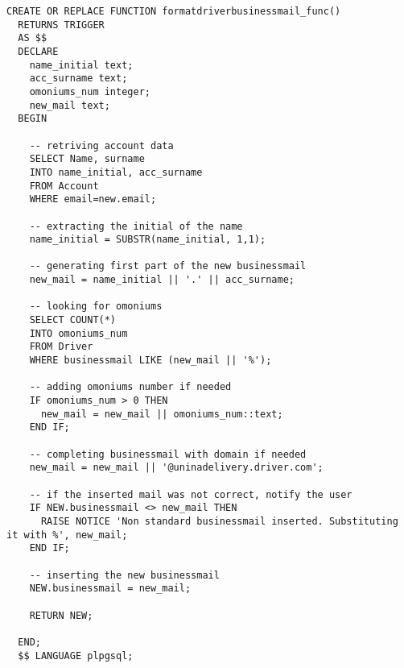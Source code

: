 \begin{lstlisting}[caption={Funzione per il vincolo \textbf{formatDriverBusinessmail}}]
  CREATE OR REPLACE FUNCTION formatdriverbusinessmail_func()
  RETURNS TRIGGER
  AS $$
  DECLARE
    name_initial text;
    acc_surname text;
    omoniums_num integer;
    new_mail text;
  BEGIN

    -- retriving account data
    SELECT Name, surname
    INTO name_initial, acc_surname
    FROM Account
    WHERE email=new.email;

    -- extracting the initial of the name
    name_initial = SUBSTR(name_initial, 1,1);

    -- generating first part of the new businessmail
    new_mail = name_initial || '.' || acc_surname;

    -- looking for omoniums
    SELECT COUNT(*)
    INTO omoniums_num
    FROM Driver
    WHERE businessmail LIKE (new_mail || '%');

    -- adding omoniums number if needed
    IF omoniums_num > 0 THEN
      new_mail = new_mail || omoniums_num::text;
    END IF;

    -- completing businessmail with domain if needed
    new_mail = new_mail || '@uninadelivery.driver.com';

    -- if the inserted mail was not correct, notify the user
    IF NEW.businessmail <> new_mail THEN
      RAISE NOTICE 'Non standard businessmail inserted. Substituting it with %', new_mail;
    END IF;

    -- inserting the new businessmail
    NEW.businessmail = new_mail;

    RETURN NEW;

  END;
  $$ LANGUAGE plpgsql;
\end{lstlisting}
\newpage
